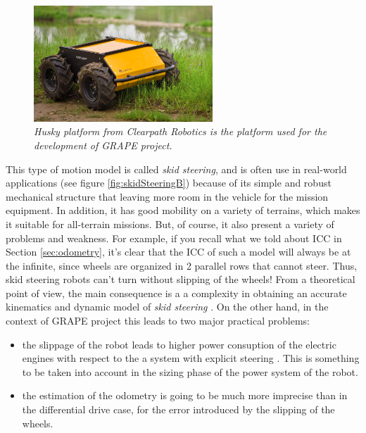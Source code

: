 \begin{figure}
	\centering
	\includegraphics[width=0.6\textwidth]{Images/background_and_tools/husky.png}
	\caption{\textit{Husky platform from Clearpath Robotics is the platform used for the development of \ac{GRAPE} project.}}
	\label{fig:husky}
\end{figure}

This type of motion model is called \textit{skid steering}, and is often use in real-world applications (see figure \ref{fig:skidSteeringB}) because of its simple and robust mechanical structure that leaving more room in the vehicle for the mission equipment. In
addition, it has good mobility on a variety of terrains, which makes it suitable
for all-terrain missions. But, of course, it also present a variety of problems and weakness. For example, if you recall what we told about \ac{ICC} in Section \ref{sec:odometry}, it's clear that the \ac{ICC} of such a model will always be at the infinite, since wheels are organized in 2 parallel rows that cannot steer. Thus, skid steering robots can't turn without slipping of the wheels! 
From a theoretical point of view, the main consequence is a a complexity in obtaining an accurate kinematics and dynamic model of \textit{skid steering} \parencite{skidSteeringDifficult}. On the other hand, in the context of \ac{GRAPE} project this leads to two major practical problems:
\begin{itemize}
	\item the slippage of the robot leads to higher power consuption of the electric engines with respect to the a system with explicit steering \parencite{skidSteeringConsumption}. This is something to be taken into account in the sizing phase of the power system of the robot.
	\item the estimation of the odometry is going to be much more imprecise than in the differential drive case, for the error introduced by the slipping of the wheels. 
\end{itemize}

